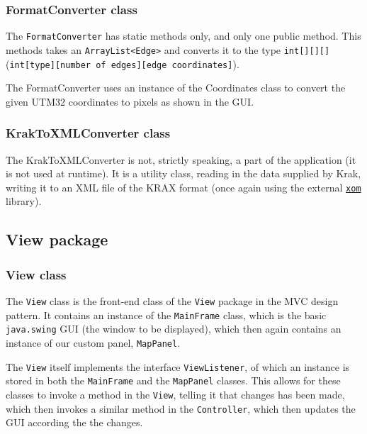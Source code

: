 \documentclass[a4paper,11pt]{article}
\begin{document}
\subsubsection{FormatConverter class} %
The \texttt{FormatConverter} has static methods only, and only one public method. This methods takes an \texttt{ArrayList<Edge>} and converts it to the type \texttt{int[][][]} (\texttt{int[type][number of edges][edge coordinates]}).

The FormatConverter uses an instance of the Coordinates class to convert the given UTM32 coordinates to pixels as shown in the GUI.

\subsubsection{KrakToXMLConverter class} %
The KrakToXMLConverter is not, strictly speaking, a part of the application (it is not used at runtime). It is a utility class, reading in the data supplied by Krak, writing it to an XML file of the KRAX format (once again using the external \href{www.xom.nu}{\texttt{xom}} library).

\subsection{View package} %

\subsubsection{View class} %
The \texttt{View} class is the front-end class of the \texttt{View} package in the MVC design pattern. It contains an instance of the \texttt{MainFrame} class, which is the basic \texttt{java.swing} GUI (the window to be displayed), which then again contains an instance of our custom panel, \texttt{MapPanel}.

The \texttt{View} itself implements the interface \texttt{ViewListener}, of which an instance is stored in both the \texttt{MainFrame} and the \texttt{MapPanel} classes. This allows for these classes to invoke a method in the \texttt{View}, telling it that changes has been made, which then invokes a similar method in the \texttt{Controller}, which then updates the GUI according the the changes.
\end{document}

